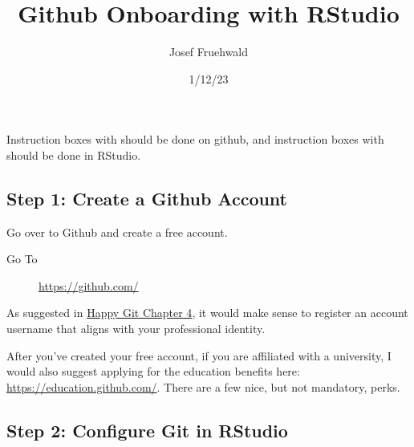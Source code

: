 \documentclass[
  letterpaper,
  DIV=11,
  numbers=noendperiod]{scrartcl}
\title{Github Onboarding with RStudio}
\author{Josef Fruehwald}
\date{1/12/23}
\begin{document}
\maketitle
\ifdefined\Shaded\renewenvironment{Shaded}{\begin{tcolorbox}[interior hidden, borderline west={3pt}{0pt}{shadecolor}, frame hidden, breakable, enhanced, sharp corners, boxrule=0pt]}{\end{tcolorbox}}\fi

Instruction boxes with  should be done on github, and
instruction boxes with  should be done in RStudio.

\hypertarget{step-1-create-a-github-account}{%
\subsection{Step 1: Create a Github
Account}\label{step-1-create-a-github-account}}

Go over to Github and create a free account.

\begin{tcolorbox}[enhanced jigsaw, leftrule=.75mm, colback=white, left=2mm, bottomrule=.15mm, rightrule=.15mm, breakable, arc=.35mm, opacityback=0, colframe=quarto-callout-tip-color-frame, toprule=.15mm]

\textbf{}\vspace{2mm}

\begin{description}
\item[Go To]
\url{https://github.com/}
\end{description}

\end{tcolorbox}

As suggested in \href{https://happygitwithr.com/github-acct.html}{Happy
Git Chapter 4}, it would make sense to register an account username that
aligns with your professional identity.

After you've created your free account, if you are affiliated with a
university, I would also suggest applying for the education benefits
here: \url{https://education.github.com/}. There are a few nice, but not
mandatory, perks.

\hypertarget{step-2-configure-git-in-rstudio}{%
\subsection{Step 2: Configure Git in
RStudio}\label{step-2-configure-git-in-rstudio}}
\end{document}

